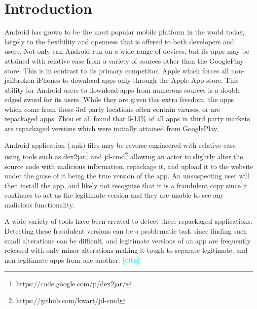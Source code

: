 \documentclass{sig-alternate}
\newcommand{\todo}[1]{\textcolor{cyan}{\textbf{[#1]}}}
\begin{document}
\section{Introduction}



Android has grown to be the most popular mobile platform in the world today, largely to the flexibility and openness that is offered to both developers and users. Not only can Android run on a wide range of devices, but its apps may be attained with relative ease from a variety of sources other than the GooglePlay store. This is in contrast to its primary competitor, Apple which forces all non-jailbroken iPhones to download apps only through the Apple App store. This ability for Android users to download apps from numerous sources is a double edged sword for its users. While they are given this extra freedom, the apps which come from these 3rd party locations often contain viruses, or are repackaged apps. Zhou et al.\cite{zhou2012detecting} found that 5-13\% of all apps in third party markets are repackaged versions which were initially attained from GooglePlay.

Android application (.apk) files may be reverse engineered with relative ease using tools such as dex2jar\footnote{https://code.google.com/p/dex2jar/} and jd-cmd\footnote{https://github.com/kwart/jd-cmd} allowing an actor to slightly alter the source code with malicious information, repackage it, and upload it to the website under the guise of it being the true version of the app. An unsuspecting user will then install the app, and likely not recognize that it is a fraudulent copy since it continues to act as the legitimate version and they are unable to see any malicious functionality.

A wide variety of tools have been created to detect these repackaged applications. Detecting these fraudulent versions can be a problematic task since finding such small alterations can be difficult, and legitimate versions of an app are frequently released with only minor alterations making it tough to separate legitimate, and non-legitimate apps from one another. \todo{cite}
\end{document}
